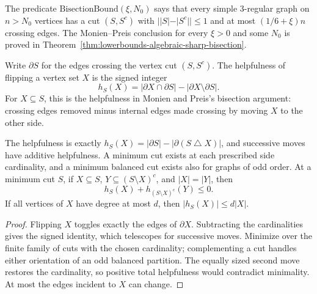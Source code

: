 \begin{definition}
  \label{def:lowerbounds-algebraic-bisection}
  \leanok
  The predicate $\mathrm{BisectionBound}(\xi,N_0)$ says that every simple
  $3$-regular graph on $n>N_0$ vertices has a cut $(S,S^c)$ with
  $||S|-|S^c||\le 1$ and at most $(1/6+\xi)n$ crossing edges. The
  Monien--Preis conclusion for every $\xi>0$ and some $N_0$ is proved in
  Theorem~\ref{thm:lowerbounds-algebraic-sharp-bisection}.
\end{definition}

\begin{definition}
  \label{def:lowerbounds-algebraic-helpfulness}
  \leanok
  Write $\partial S$ for the edges crossing the vertex cut $(S,S^c)$.
  The helpfulness of flipping a vertex set $X$ is the signed integer
  \[
    h_S(X)=|\partial X\cap\partial S|-|\partial X\setminus\partial S|.
  \]
  For $X\subseteq S$, this is the helpfulness in Monien and Preis's
  bisection argument: crossing edges removed minus internal edges made
  crossing by moving $X$ to the other side.
\end{definition}

\begin{theorem}
  \label{thm:lowerbounds-algebraic-cut-improvement}
  \leanok
  The helpfulness is exactly
  $h_S(X)=|\partial S|-|\partial(S\mathbin{\triangle}X)|$, and
  successive moves have additive helpfulness. A minimum cut exists at
  each prescribed side cardinality, and a minimum balanced cut exists
  also for graphs of odd order. At a minimum cut $S$, if $X\subseteq S$,
  $Y\subseteq(S\setminus X)^c$, and $|X|=|Y|$, then
  \[
    h_S(X)+h_{(S\setminus X)^c}(Y)\le 0.
  \]
  If all vertices of $X$ have degree at most $d$, then
  $|h_S(X)|\le d|X|$.
\end{theorem}
\begin{proof}
  \leanok
  Flipping $X$ toggles exactly the edges of $\partial X$.
  Subtracting the cardinalities gives the signed identity, which
  telescopes for successive moves. Minimize over the finite family of
  cuts with the chosen cardinality; complementing a cut handles either
  orientation of an odd balanced partition. The equally sized second
  move restores the cardinality, so positive total helpfulness would
  contradict minimality. At most the edges incident to $X$ can change.
\end{proof}

